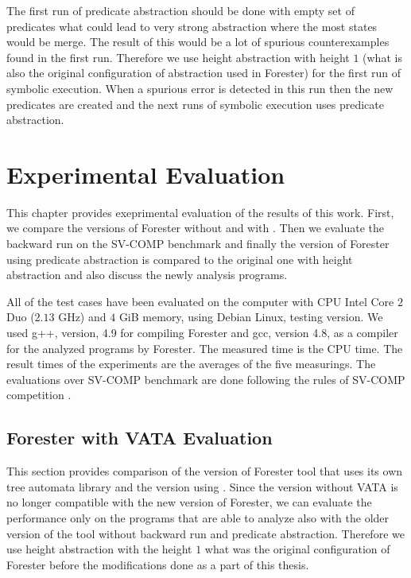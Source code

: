 The first run of predicate abstraction should be done
with empty set of predicates what could lead to very
strong abstraction where the most states would be merge.
The result of this would be a lot of spurious counterexamples found
in the first run.
Therefore we use height abstraction with height $1$ (what is
also the original configuration of abstraction used in Forester)
for the first run of symbolic execution.
When a spurious error is detected in this run then the new
predicates are created and the next runs of symbolic execution uses predicate abstraction.


\chapter{Experimental Evaluation}
\label{ch:eval}

This chapter provides exeprimental evaluation of the results of this work.
First, we compare the versions of Forester without and with \vata.
Then we evaluate the backward run on the SV-COMP benchmark
and finally the version of Forester using predicate abstraction is compared to the
original one with height abstraction and also discuss the newly analysis programs.

All of the test cases have been evaluated on the computer with CPU Intel Core $2$ Duo ($2.13$ GHz)
and $4$ GiB memory, using Debian Linux, testing version.
We used g++, version, 4.9 for compiling Forester and gcc, version 4.8,
as a compiler for the analyzed programs by Forester.
The measured time is the CPU time.
The result times of the experiments are the averages of the five measurings.
The evaluations over SV-COMP benchmark are done following the rules of
SV-COMP competition \cite{www:svcomp}.

\section{Forester with VATA Evaluation}

This section provides comparison of the version of Forester tool
that uses its own tree automata library and the version using \vata.
Since the version without VATA is no longer compatible with the
new version of Forester, we can evaluate the performance only
on the programs that are able to analyze also with the older
version of the tool without backward run and predicate abstraction.
Therefore we use height abstraction with the height $1$
what was the original configuration of Forester before the
modifications done as a part of this thesis.

